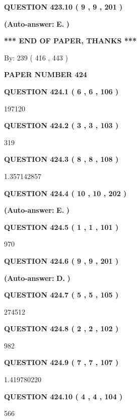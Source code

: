 \documentclass{ctexart}
\begin{document}
  
{\textbf{\large{QUESTION
423.10 
 ( 9 , 9 , 201 )
}}}
 
 
{\textbf{(Auto-answer:}}
{\textbf{\large{
E.}}}
{\textbf{)}}
 
 
   
   
   
   
\vspace{1.0in} 
{\textbf{\large{ *** END OF PAPER, THANKS *** }}} 
   
   
\hspace{1.0in} By: 
 239 ( 416 ,  443 )
   
   
   
   
\newpage 
\setcounter{page}{ 
   424001 } 
   
   
 {\textbf{ \Large{ PAPER NUMBER  424  }}}
   
   
   
   
  
  
{\textbf{\large{QUESTION
424.1 
 ( 6 , 6 , 106 )
}}}

197120
  
  
{\textbf{\large{QUESTION
424.2 
 ( 3 , 3 , 103 )
}}}

319
  
  
{\textbf{\large{QUESTION
424.3 
 ( 8 , 8 , 108 )
}}}

1.357142857
  
  
{\textbf{\large{QUESTION
424.4 
 ( 10 , 10 , 202 )
}}}
 
 
{\textbf{(Auto-answer:}}
{\textbf{\large{
E.}}}
{\textbf{)}}
 
 
  
  
{\textbf{\large{QUESTION
424.5 
 ( 1 , 1 , 101 )
}}}

970
  
  
{\textbf{\large{QUESTION
424.6 
 ( 9 , 9 , 201 )
}}}
 
 
{\textbf{(Auto-answer:}}
{\textbf{\large{
D.}}}
{\textbf{)}}
 
 
  
  
{\textbf{\large{QUESTION
424.7 
 ( 5 , 5 , 105 )
}}}

274512
  
  
{\textbf{\large{QUESTION
424.8 
 ( 2 , 2 , 102 )
}}}

982
  
  
{\textbf{\large{QUESTION
424.9 
 ( 7 , 7 , 107 )
}}}

1.419780220
  
  
{\textbf{\large{QUESTION
424.10 
 ( 4 , 4 , 104 )
}}}

566
   
   
   
\end{document}
